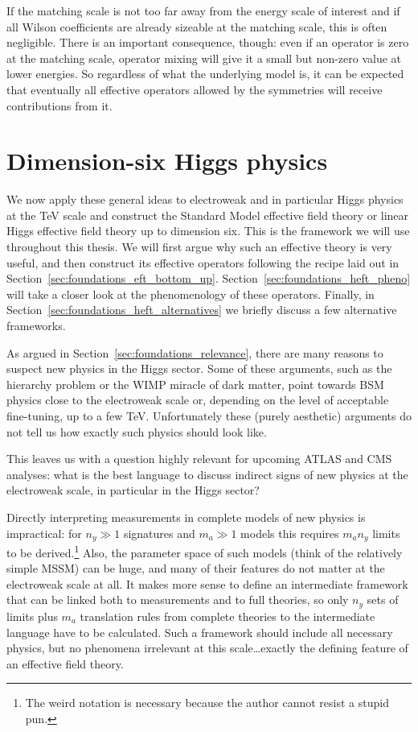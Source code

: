 If the matching scale is not too far away from the energy scale of
interest and if all Wilson coefficients are already sizeable at the
matching scale, this is often negligible. There is an important
consequence, though: even if an operator is zero at the matching
scale, operator mixing will give it a small but non-zero value at
lower energies. So regardless of what the underlying model is, it can
be expected that eventually all effective operators allowed by the
symmetries will receive contributions from it. 



\section{Dimension-six Higgs physics}
\label{sec:foundations_higgs_eft}

We now apply these general ideas to electroweak and in particular
Higgs physics at the TeV scale and construct the Standard Model
effective field theory or linear Higgs effective field theory up to
dimension six. This is the framework we will use throughout this
thesis. We will first argue why such an effective theory is very
useful, and then construct its effective operators following the
recipe laid out in
Section~\ref{sec:foundations_eft_bottom_up}. Section~\ref{sec:foundations_heft_pheno}
will take a closer look at the phenomenology of these
operators. Finally, in Section~\ref{sec:foundations_heft_alternatives}
we briefly discuss a few alternative frameworks.

\newparagraph
%
As argued in Section~\ref{sec:foundations_relevance}, there are many
reasons to suspect new physics in the Higgs sector. Some of these
arguments, such as the hierarchy problem or the WIMP miracle of dark
matter, point towards BSM physics close to the electroweak scale or,
depending on the level of acceptable fine-tuning, up to a few
TeV. Unfortunately these (purely aesthetic) arguments do not tell us
how exactly such physics should look like.

This leaves us with a question highly relevant for upcoming ATLAS and
CMS analyses: what is the best language to discuss indirect signs of
new physics at the electroweak scale, in particular in the Higgs
sector?

Directly interpreting measurements in complete models of new physics
is impractical: for $n_y \gg 1$ signatures and $m_a \gg 1$ models this
requires $m_a n_y$ limits to be derived.\footnote{The weird notation
  is necessary because the author cannot resist a stupid pun.} Also,
the parameter space of such models (think of the relatively simple
MSSM) can be huge, and many of their features do not matter at the
electroweak scale at all. It makes more sense to define an
intermediate framework that can be linked both to measurements and to
full theories, so only $n_y$ sets of limits plus $m_a$ translation
rules from complete theories to the intermediate language have to be
calculated. Such a framework should include all necessary physics, but
no phenomena irrelevant at this scale\dots exactly the defining
feature of an effective field theory.




